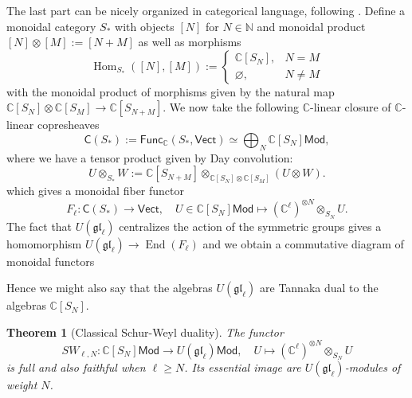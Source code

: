\documentclass[11pt]{report}
\newtheorem{theorem}{Theorem}[section]
\theoremstyle{definition}
\theoremstyle{remark}
\theoremstyle{remark}
\newcommand{\Hom}{\operatorname{Hom}}
\newcommand{\End}{\operatorname{End}}
\newcommand{\N}{\mathbb{N}}
\newcommand{\C}{\mathbb{C}}
\begin{document}
The last part can be nicely organized in categorical language, following \cite{article:davydov:2010}. Define a monoidal category $S_*$ with objects $[N]$ for $N \in \N$ and monoidal product $[N] \otimes [M] := [N+M]$ as well as morphisms
\begin{equation*}
\Hom_{S_*}([N],[M]) :=
\begin{cases}
\C[S_N], & N = M \\
\varnothing, & N \neq M
\end{cases}
\end{equation*}
with the monoidal product of morphisms given by the natural map $\C[S_N] \otimes \C[S_M] \to \C[S_{N+M}]$. We now take the following $\C$-linear closure of $\C$-linear copresheaves
\begin{equation*}
\mathsf{C}(S_*) := \mathsf{Func}_\C(S_*,\mathsf{Vect}) \simeq \bigoplus_N \C[S_N]\mathsf{Mod},
\end{equation*}
where we have a tensor product given by Day convolution:
\begin{equation*}
U \otimes_{S_*} W := \C[S_{N+M}] \otimes_{\C[S_N] \otimes \C[S_M]} (U \otimes W).
\end{equation*}
which gives a monoidal fiber functor
\begin{equation*}
F_\ell: \mathsf{C}(S_*) \to \mathsf{Vect}, \quad U \in \C[S_N]\mathsf{Mod} \mapsto (\C^\ell)^{\otimes N} \otimes_{S_N} U.
\end{equation*}
The fact that $U(\mathfrak{gl}_\ell)$ centralizes the action of the symmetric groups gives a homomorphism $U(\mathfrak{gl}_\ell) \to \End(F_\ell)$ and we obtain a commutative diagram of monoidal functors
\begin{center}
\end{center}
Hence we might also say that the algebras $U(\mathfrak{gl}_\ell)$ are Tannaka dual to the algebras $\C[S_N]$.

\begin{theorem}[Classical Schur-Weyl duality]
The functor
\begin{equation*}
SW_{\ell,N}: \C[S_N]\mathsf{Mod} \to U(\mathfrak{gl}_\ell)\mathsf{Mod}, \quad U \mapsto (\C^\ell)^{\otimes N} \otimes_{S_N} U
\end{equation*}
is full and also faithful when $\ell \geq N$. Its essential image are $U(\mathfrak{gl}_\ell)$-modules of weight $N$.
\end{theorem}
\end{document}
